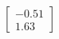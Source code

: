 \documentclass[preview]{standalone}
\begin{document}
\begin{align*}
\begin{bmatrix} -0.51 \\ 1.63 \end{bmatrix}
\end{align*}
\end{document}
